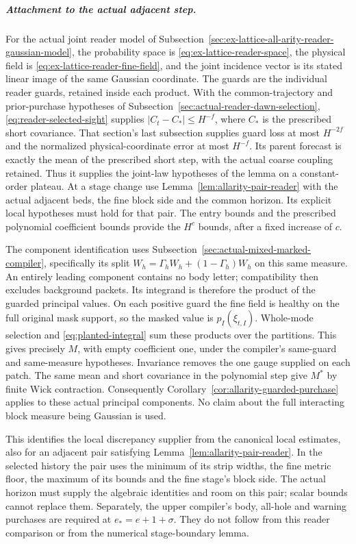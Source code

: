 \subparagraph{Attachment to the actual adjacent step.}
For the actual joint reader model of
Subsection~\ref{sec:ex-lattice-all-arity-reader-gaussian-model}, the
probability space is \eqref{eq:ex-lattice-reader-space}, the physical
field is \eqref{eq:ex-lattice-reader-fine-field}, and the joint
incidence vector is its stated linear image of the same Gaussian
coordinate. The guards are the individual reader guards, retained
inside each product. With the common-trajectory and prior-purchase hypotheses
of Subsection~\ref{sec:actual-reader-dawn-selection},
\eqref{eq:reader-selected-sight} supplies $|C_t-C_*|\le H^{-f}$,
where $C_*$ is the prescribed short covariance. That section's last
subsection supplies guard loss at most $H^{-2f}$ and the normalized
physical-coordinate error at most $H^{-f}$. Its parent forecast is
exactly the mean of the prescribed short step, with the actual coarse
coupling retained. Thus it supplies the joint-law hypotheses of the
lemma on a constant-order plateau. At a stage change use
Lemma~\ref{lem:allarity-pair-reader} with the actual adjacent beds,
the fine block side and the common horizon. Its explicit local
hypotheses must hold for that pair. The entry bounds and the prescribed
polynomial coefficient bounds provide the $H^c$ bounds, after a fixed
increase of $c$.

The component identification uses
Subsection~\ref{sec:actual-mixed-marked-compiler}, specifically its
split $W_h=\Gamma_hW_h+(1-\Gamma_h)W_h$ on this same measure.
An entirely leading component contains no body letter; compatibility
then excludes background packets. Its integrand is therefore the
product of the guarded principal values. On each positive guard the
fine field is healthy on the full original mask support, so the masked
value is $p_I(\xi_{t,I})$. Whole-mode selection and
\eqref{eq:planted-integral} sum these products over the partitions.
This gives precisely $M$, with empty coefficient one, under the
compiler's same-guard and same-measure hypotheses. Invariance removes
the one gauge supplied on each patch. The same mean and short covariance
in the polynomial step give $M^*$ by finite Wick contraction.
Consequently Corollary~\ref{cor:allarity-guarded-purchase} applies to
these actual principal components. No claim about the full interacting
block measure being Gaussian is used.

This identifies the local discrepancy supplier from the canonical
local estimates, also for an adjacent pair satisfying
Lemma~\ref{lem:allarity-pair-reader}. In the selected history the
pair uses the minimum of its strip widths, the fine metric floor,
the maximum of its bounds and the fine stage's block side. The
actual horizon must supply the algebraic identities and room on
this pair; scalar bounds cannot replace them. Separately, the
upper compiler's body, all-hole and warning purchases are required
at $e_*=e+1+\sigma$. They do not follow from this reader comparison
or from the numerical stage-boundary lemma.

